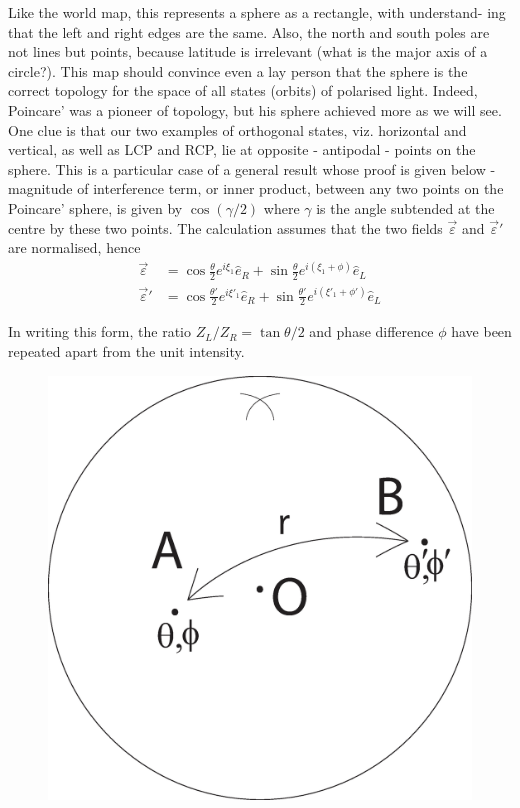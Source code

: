 Like the world map, this represents a sphere as a rectangle, with understand-
ing that the left and right edges are the same. Also, the north and south poles
are not lines but points, because latitude is irrelevant (what is the major axis of
a circle?). This map should convince even a lay person that the sphere is the
correct topology for the space of all states (orbits) of polarised light. Indeed,
Poincare’ was a pioneer of topology, but his sphere achieved more as we will
see. One clue is that our two examples of orthogonal states, viz. horizontal and
vertical, as well as LCP and RCP, lie at opposite - antipodal - points on the
sphere. This is a particular case of a general result whose proof is given below
- magnitude of interference term, or inner product, between any two points on
the Poincare' sphere, is given by $\cos(\gamma/2)$ where $\gamma$ is the angle subtended at the
centre by these two points. The calculation assumes that the two fields $\overrightarrow{\varepsilon}$ and
$\overrightarrow{\varepsilon}'$ are normalised, hence
\begin{align*}
\overrightarrow{\varepsilon} & = \cos \frac{\theta}{2} e^{i \xi_1} \hat{e}_R + \sin \frac{\theta}{2} e^{i(\xi_1+ \phi)} \hat{e}_L\\
\overrightarrow{\varepsilon}' & = \cos \frac{\theta'}{2} e^{i \xi'_1} \hat{e}_R + \sin \frac{\theta'}{2} e^{i (\xi'_1 + \phi')} \hat{e}_L
\end{align*}

In writing this form, the ratio $Z_L /Z_R = \tan \theta/2$ and phase difference $\phi$ have
been repeated apart from the unit intensity.
\begin{figure}[H]
\centering
\includegraphics[scale=0.1]{src/images/chap26/7.eps}
\end{figure}

